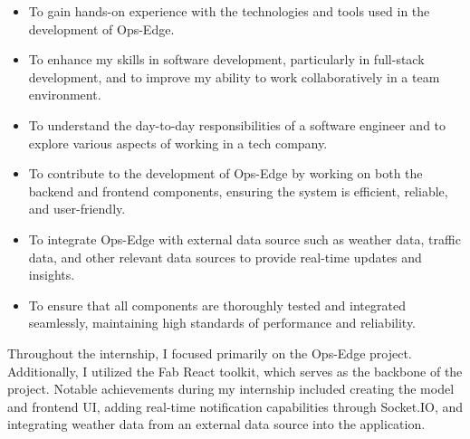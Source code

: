 \begin{itemize}
    \item To gain hands-on experience with the technologies and tools used in the development of Ops-Edge.
    \item To enhance my skills in software development, particularly in full-stack development, and to improve my ability to work collaboratively in a team environment.
    \item To understand the day-to-day responsibilities of a software engineer and to explore various aspects of working in a tech company.
    \item To contribute to the development of Ops-Edge by working on both the backend and frontend components, ensuring the system is efficient, reliable, and user-friendly.
    \item To integrate Ops-Edge with external data source such as weather data, traffic data, and other relevant data sources to provide real-time updates and insights.
    \item To ensure that all components are thoroughly tested and integrated seamlessly, maintaining high standards of performance and reliability.
\end{itemize}

Throughout the internship, I focused primarily on the Ops-Edge project. Additionally, I utilized the Fab React toolkit, which serves as the backbone of the project. Notable achievements during my internship included creating the model and frontend UI, adding real-time notification capabilities through Socket.IO, and integrating weather data from an external data source into the application.